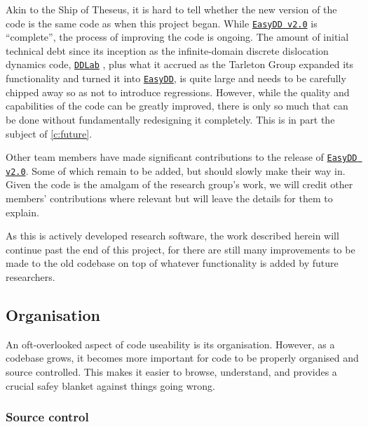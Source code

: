 Akin to the Ship of Theseus, it is hard to tell whether the new version of the code is the same code as when this project began. While \href{https://github.com/TarletonGroup/EasyDD}{\texttt{EasyDD v2.0}} is ``complete'', the process of improving the code is ongoing. The amount of initial technical debt since its inception as the infinite-domain discrete dislocation dynamics code, \href{http://micro.stanford.edu/wiki/Main_Page}{\texttt{DDLab}} \cite{ddlab}, plus what it accrued as the Tarleton Group expanded its functionality and turned it into \href{https://github.com/TarletonGroup/EasyDD/tree/65907b022d1fe408fc1b2e5c5ca2bd1797ccae04}{\texttt{EasyDD}}, is quite large and needs to be carefully chipped away so as not to introduce regressions. However, while the quality and capabilities of the code can be greatly improved, there is only so much that can be done without fundamentally redesigning it completely. This is in part the subject of \cref{c:future}.

Other team members have made significant contributions to the release of \href{https://github.com/TarletonGroup/EasyDD}{\texttt{EasyDD v2.0}}. Some of which remain to be added, but should slowly make their way in. Given the code is the amalgam of the research group's work, we will credit other members' contributions where relevant but will leave the details for them to explain.

As this is actively developed research software, the work described herein will continue past the end of this project, for there are still many improvements to be made to the old codebase on top of whatever functionality is added by future researchers.

\subsection{Organisation}

An oft-overlooked aspect of code useability is its organisation. However, as a codebase grows, it becomes more important for code to be properly organised and source controlled. This makes it easier to browse, understand, and provides a crucial safey blanket against things going wrong.

\subsubsection{Source control}

